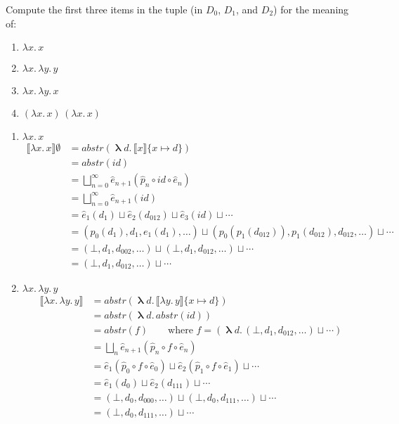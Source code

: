 \documentclass{tufte-handout}
\newcommand{\SEM}[1]{\llbracket #1 \rrbracket}
\newcommand{\LAM}[1]{\lambda #1.\,}
\newcommand{\MLAM}[1]{\boldsymbol\uplambda #1.\,}
\newcommand{\APP}[0]{\,}
\begin{document}
\begin{Exercise}
  Compute the first three items in the tuple (in $D_0$, $D_1$, and
  $D_2$) for the meaning of:
  \begin{enumerate}
  \item $\LAM{x}x$
  \item $\LAM{x}\LAM{y}y$
  \item $\LAM{x}\LAM{y}x$
  \item $(\LAM{x}x) \APP (\LAM{x}x)$
  \end{enumerate}
\end{Exercise}
\begin{Answer}
  \begin{enumerate}
  \item $\LAM{x}x$ 
    \begin{align*}
      \SEM{\LAM{x} x}\emptyset &= \mathit{abstr}(\MLAM{d} \SEM{x}\{x\mapsto d\}) \\
      &= \mathit{abstr}(\mathit{id}) \\
      &= \bigsqcup_{n=0}^{\infty} \hat{e}_{n+1}(\hat{p}_n\circ \mathit{id} \circ \hat{e}_n) \\
      &= \bigsqcup_{n=0}^{\infty} \hat{e}_{n+1}(\mathit{id}) \\
      &= \hat{e}_1(d_1) \sqcup \hat{e}_2 (d_{012}) 
      \sqcup \hat{e}_3 (\mathit{id}) 
      \sqcup \cdots \\
      &= (p_0(d_1), d_1, e_1(d_1), \ldots) \sqcup 
         (p_0(p_1(d_{012})), p_1(d_{012}), d_{012}, \ldots) \sqcup \cdots\\
      &= (\bot, d_1, d_{002}, \ldots) \sqcup 
         (\bot, d_1, d_{012}, \ldots) \sqcup \cdots\\
      &= (\bot, d_1, d_{012}, \ldots) \sqcup \cdots
    \end{align*}

  \item $\LAM{x}\LAM{y}y$
    \begin{align*}
      \SEM{\LAM{x}\LAM{y}y} &=
      \mathit{abstr}(\MLAM{d}\SEM{\LAM{y}y}\{x\mapsto d\}) \\
      &= \mathit{abstr}(\MLAM{d} \mathit{abstr}(\mathit{id})) \\
      &= \mathit{abstr}(f) 
        \qquad \text{where } f=(\MLAM{d} (\bot, d_1, d_{012}, \ldots) \sqcup \cdots) \\
      &= \bigsqcup_n \hat{e}_{n+1}(\hat{p}_n \circ f \circ \hat{e}_n) \\
      &= \hat{e}_{1}(\hat{p}_0 \circ f \circ \hat{e}_0)
          \sqcup 
          \hat{e}_{2}(\hat{p}_1 \circ f \circ \hat{e}_1)
          \sqcup \cdots \\
      &= \hat{e}_{1}(d_0)
          \sqcup 
          \hat{e}_{2}(d_{111})
          \sqcup \cdots \\
      &= (\bot,d_0, d_{000}, \ldots)
         \sqcup
         (\bot, d_0, d_{111}, \ldots)
         \sqcup \cdots \\
      &= (\bot, d_0, d_{111}, \ldots) \sqcup \cdots
    \end{align*}


\end{enumerate}
\end{Answer}
\end{document}
